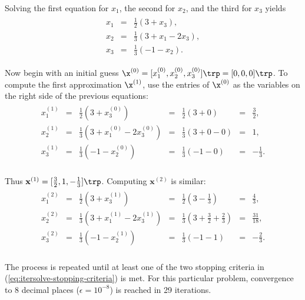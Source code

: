 Solving the first equation for $x_1$, the second for $x_2$, and the third for $x_3$ yields
\begin{align*}
\begin{array}{ccc}
    x_1 & = & \frac{1}{2}(3 + x_3), \\
    x_2 & = & \frac{1}{3}(3 + x_1 - 2x_3), \\
    x_3 & = & \frac{1}{3}(-1 - x_2).
\end{array}
\end{align*}

Now begin with an initial guess $\x^{(0)} = [x^{(0)}_1, x^{(0)}_2, x^{(0)}_3]\trp = [0,0,0]\trp$.
To compute the first approximation $\x^{(1)}$, use the entries of $\x^{(0)}$ as the variables on the right side of the previous equations:
\begin{align*}
\begin{array}{ccccccr}
    x^{(1)}_1 & = & \frac{1}{2}(3 + x^{(0)}_3) & = & \frac{1}{2} (3 + 0) & = & \frac{3}{2}, \\
    x^{(1)}_2 & = & \frac{1}{3}(3 + x^{(0)}_1 - 2x^{(0)}_3) & = & \frac{1}{3} (3 + 0 - 0) & = & 1, \\
    x^{(1)}_3 & = & \frac{1}{3}(-1 - x^{(0)}_2) & = & \frac{1}{3} (-1 - 0) & = & -\frac{1}{3}. \\
\end{array}
\end{align*}

Thus $\mathbf{x}^{(1)} = [\frac{3}{2}, 1, -\frac{1}{3}]\trp$.
Computing $\mathbf{x}^{(2)}$ is similar:
\begin{align*}
\begin{array}{ccccccc}
x^{(2)}_1 & = & \frac{1}{2} ( 3 + x^{(1)}_3)  & = & \frac{1}{2} (3 - \frac{1}{3})     & = & \frac{4}{3}, \\
x^{(2)}_2 & = & \frac{1}{3} ( 3 + x^{(1)}_1 - 2x^{(1)}_3) & = & \frac{1}{3} (3 + \frac{3}{2} + \frac{2}{3}) & = &  \frac{31}{18}, \\
x^{(2)}_3 & = & \frac{1}{3} ( -1 - x^{(1)}_2)       & = & \frac{1}{3} (-1 - 1)    & = & -\frac{2}{3}. \\
\end{array}
\end{align*}

The process is repeated until at least one of the two stopping criteria in (\ref{eq:itersolve-stopping-criteria}) is met.
For this particular problem, convergence to 8 decimal places ($\epsilon = 10^{-8}$) is reached in 29 iterations.

